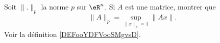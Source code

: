 \begin{exercice}\label{exoGeomAnal-0040}

    Soit \( \| . \|_p\) la norme $p$ sur \( \eR^n\). Si \( A\) est une matrice, montrer que
    \begin{equation}
        \| A \|_p=\sup_{\| x \|_p=1}\| Ax \|.
    \end{equation}
    Voir la définition \ref{DEFooYDFVooSMgvsD}.

\end{exercice}
